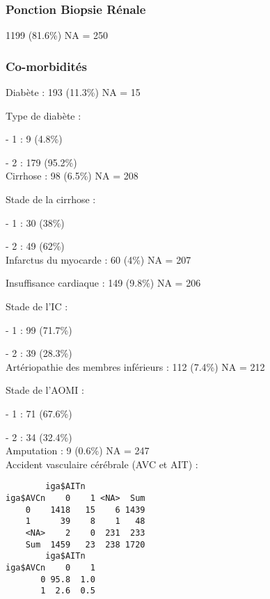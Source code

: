 \documentclass[11pt,a4paper]{article}\usepackage[]{graphicx}\usepackage[]{color}
\makeatletter
\newenvironment{kframe}{%
 \def\at@end@of@kframe{}%
 \ifinner\ifhmode%
  \def\at@end@of@kframe{\end{minipage}}%
  \begin{minipage}{\columnwidth}%
 \fi\fi%
 \def\FrameCommand##1{\hskip\@totalleftmargin \hskip-\fboxsep
 \colorbox{shadecolor}{##1}\hskip-\fboxsep
     \hskip-\linewidth \hskip-\@totalleftmargin \hskip\columnwidth}%
 \MakeFramed {\advance\hsize-\width
   \@totalleftmargin\z@ \linewidth\hsize
   \@setminipage}}%
 {\par\unskip\endMakeFramed%
 \at@end@of@kframe}
\newenvironment{knitrout}{}{} %
\makeatother
\begin{document}
      \subsubsection{Ponction Biopsie Rénale}

1199 (81.6\%) NA = 250

      \subsubsection{Co-morbidités}



Diabète : 193 (11.3\%) NA = 15

Type de diabète : 

- 1 : 9 (4.8\%)

- 2 : 179 (95.2\%)
~\\

Cirrhose : 98 (6.5\%) NA = 208

Stade de la cirrhose :

- 1 : 30 (38\%)

- 2 : 49 (62\%)
~\\

Infarctus du myocarde : 60 (4\%) NA = 207

Insuffisance cardiaque : 149 (9.8\%) NA = 206

Stade de l’IC :

- 1 : 99 (71.7\%)

- 2 : 39 (28.3\%)
~\\

Artériopathie des membres inférieurs : 112 (7.4\%) NA = 212

Stade de l’AOMI : 

- 1 : 71 (67.6\%)

- 2 : 34 (32.4\%)
~\\

Amputation : 9 (0.6\%) NA = 247
~\\

Accident vasculaire cérébrale (AVC et AIT) :

\begin{knitrout}
\color{fgcolor}\begin{kframe}
\begin{verbatim}
        iga$AITn
iga$AVCn    0    1 <NA>  Sum
    0    1418   15    6 1439
    1      39    8    1   48
    <NA>    2    0  231  233
    Sum  1459   23  238 1720
        iga$AITn
iga$AVCn    0    1
       0 95.8  1.0
       1  2.6  0.5
\end{verbatim}
\end{kframe}
\end{knitrout}
\end{document}
